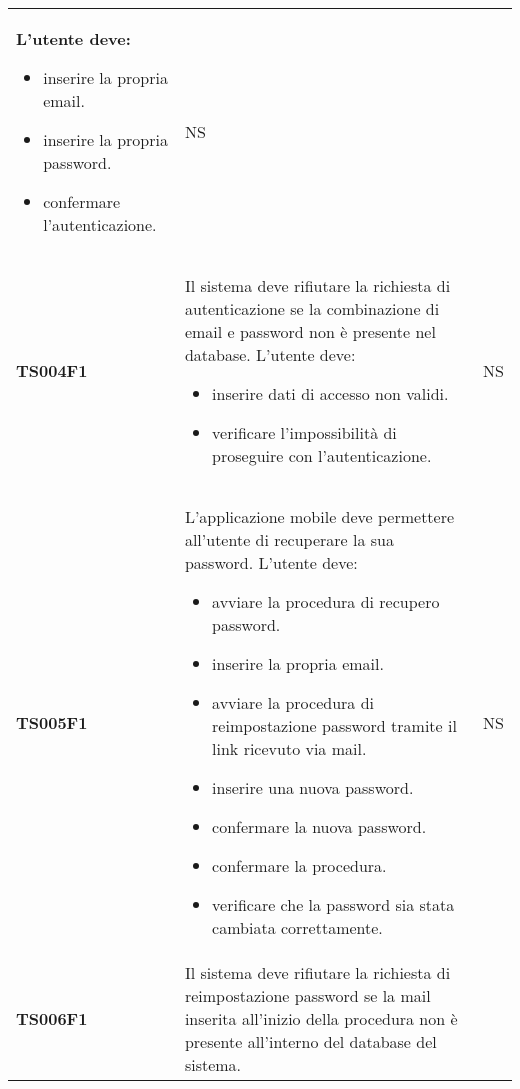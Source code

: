 \documentclass[../piano-di-qualifica.tex]{subfiles}
\begin{document}
\begin{centering}
\begin{longtable}[H]{>{\centering\bfseries}m{3cm} >{}p{10cm} >{\centering\arraybackslash}m{3cm}}
                      L'utente deve:
                      \begin{itemize}
                        \item inserire la propria email.
                        \item inserire la propria password.
                        \item confermare l'autenticazione.
                      \end{itemize}
                    & NS \\
        TS004F1     & Il sistema deve rifiutare la richiesta di autenticazione se la combinazione di email e password non è presente nel database. \newline
                      L'utente deve:
                      \begin{itemize}
                        \item inserire dati di accesso non validi.
                        \item verificare l'impossibilità di proseguire con l'autenticazione.
                      \end{itemize}
                    & NS \\
        TS005F1     & L'applicazione mobile deve permettere all'utente di recuperare la sua password. \newline
                      L'utente deve:
                      \begin{itemize}
                        \item avviare la procedura di recupero password.
                        \item inserire la propria email.
                        \item avviare la procedura di reimpostazione password tramite il link ricevuto via mail.
                        \item inserire una nuova password.
                        \item confermare la nuova password.
                        \item confermare la procedura.
                        \item verificare che la password sia stata cambiata correttamente.
                      \end{itemize}
                    & NS \\
        TS006F1     & Il sistema deve rifiutare la richiesta di reimpostazione password se la mail inserita all'inizio della procedura non è presente all'interno del database del sistema. \newline

\end{longtable}
\end{centering}
\end{document}
